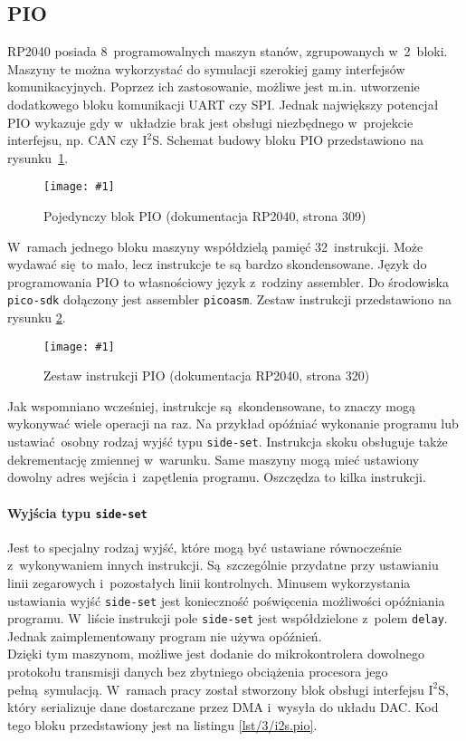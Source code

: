\documentclass[polish]{aghengthesis}
\newcommand{\imgint}[4]{
	\begin{figure}[{#4}]
		\centering
		\texttt{[image: \#1]}
		\caption{#2}
		\label{#1}
	\end{figure}
}
\newcommand{\imgh}[3]{\imgint{#1}{#2}{#3}{H}}
\newcommand{\isqs}{$\text{I}^{2}\text{S}$}
\newcommand{\sset}{\lstinline|side-set|}
\begin{document}
		\subsection{PIO}
			RP2040 posiada 8~programowalnych maszyn stanów, zgrupowanych w~2~bloki.
			Maszyny te można wykorzystać do symulacji szerokiej gamy interfejsów komunikacyjnych.
			Poprzez ich zastosowanie, możliwe jest m.in. utworzenie dodatkowego bloku komunikacji UART czy SPI.
			Jednak największy potencjał PIO wykazuje gdy w~układzie brak jest obsługi niezbędnego w~projekcie interfejsu, np. CAN czy \isqs{}.
			Schemat budowy bloku PIO przedstawiono na rysunku~\ref{3/pio_block}.
			\imgh{3/pio_block}{Pojedynczy blok PIO (dokumentacja RP2040\textsuperscript{\cite{pico_pdf}}, strona 309)}{0.75}
			
			W~ramach jednego bloku maszyny współdzielą pamięć 32 instrukcji. Może wydawać się to mało, lecz instrukcje te są bardzo skondensowane. Język do programowania PIO to własnościowy język z~rodziny assembler. Do środowiska \lstinline|pico-sdk| dołączony jest assembler \lstinline|picoasm|. Zestaw instrukcji przedstawiono na rysunku \ref{3/pio_instr}.
			\imgh{3/pio_instr}{Zestaw instrukcji PIO (dokumentacja RP2040, strona 320)}{0.7}
			
			Jak wspomniano wcześniej, instrukcje są skondensowane, to znaczy mogą wykonywać wiele operacji na raz. Na przykład opóźniać wykonanie programu lub ustawiać osobny rodzaj wyjść typu \sset{}.
			Instrukcja skoku obsługuje także dekrementację zmiennej w~warunku. Same maszyny mogą mieć ustawiony dowolny adres wejścia i~zapętlenia programu. Oszczędza to kilka instrukcji.
			
			\paragraph{Wyjścia typu \sset{}}
				Jest to specjalny rodzaj wyjść, które mogą być ustawiane równocześnie z~wykonywaniem innych instrukcji. Są szczególnie przydatne przy ustawianiu linii zegarowych i~pozostałych linii kontrolnych. Minusem wykorzystania ustawiania wyjść \sset{} jest konieczność poświęcenia możliwości opóźniania programu. W~liście instrukcji pole \sset{} jest współdzielone z~polem \lstinline|delay|. Jednak zaimplementowany program nie używa opóźnień.
			$ $\\
			
			Dzięki tym maszynom, możliwe jest dodanie do mikrokontrolera dowolnego protokołu transmisji danych bez zbytniego obciążenia procesora jego pełną symulacją.
			W~ramach pracy został stworzony blok obsługi interfejsu \isqs{}, który serializuje dane dostarczane przez DMA i~wysyła do układu DAC. Kod tego bloku przedstawiony jest na listingu \ref{lst/3/i2s.pio}.
			$ $\\
			
\end{document}
